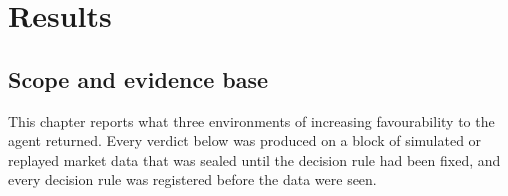 %
%
%
%
%

\chapter{Results}

\section{Scope and evidence base}\label{sec:res-orient}

This chapter reports what three environments of increasing favourability to the agent
returned. Every verdict below was produced on a block of simulated or replayed market data
that was sealed until the decision rule had been fixed, and every decision rule was
registered before the data were seen.

